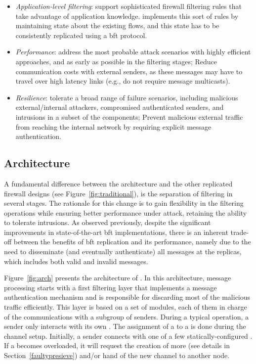 \begin{itemize}

\item \emph{Application-level filtering}: support sophisticated firewall filtering rules that take advantage of application knowledge. \sieveq implements this sort of rules by maintaining state about the existing flows, and this state has to be consistently replicated using a \gls{bft} protocol.

\item \emph{Performance}: address the most probable attack scenarios with highly efficient approaches, and as early as possible in the filtering stages; Reduce communication costs with external senders, as these messages may have to travel over high latency links (e.g., do not require message multicasts).	

\item \emph{Resilience}: tolerate a broad range of failure scenarios, including malicious external/internal attackers, compromised authenticated senders, and intrusions in a subset of the \sieveq components; Prevent malicious external traffic from reaching the internal network by requiring explicit message authentication.

\end{itemize}

\subsection{\sieveq Architecture}

A fundamental difference between the \sieveq architecture and the other replicated firewall designs (see Figure~\ref{fig:traditional}), is the separation of filtering in several stages.
The rationale for this change is to gain flexibility in the filtering operations while ensuring better performance under attack, retaining the ability to tolerate intrusions.
As observed previously, despite the significant improvements in state-of-the-art \gls{bft} implementations, there is an inherent trade-off between the benefits of \gls{bft} replication and its performance, namely due to the need to disseminate (and eventually authenticate) all messages at the replicas, which includes both valid and invalid messages.

Figure~\ref{fig:arch} presents the architecture of \sieveq. 
In this architecture, message processing starts with a first filtering layer that implements a message authentication mechanism and is responsible for discarding most of the malicious traffic efficiently. 
This layer is based on a set of \presieve modules, each of them in charge of the communications with a subgroup of senders. 
During a typical operation, a sender only interacts with its own \presieve.
The assignment of a \sender to a \presieve is done during the channel setup.
Initially, a sender connects with one of a few statically-configured \presieves.
If a \presieve becomes overloaded, it will request the creation of more \presieves (see details in Section~\ref{faultypresieve}) and/or hand of the new \sender channel to another node.

